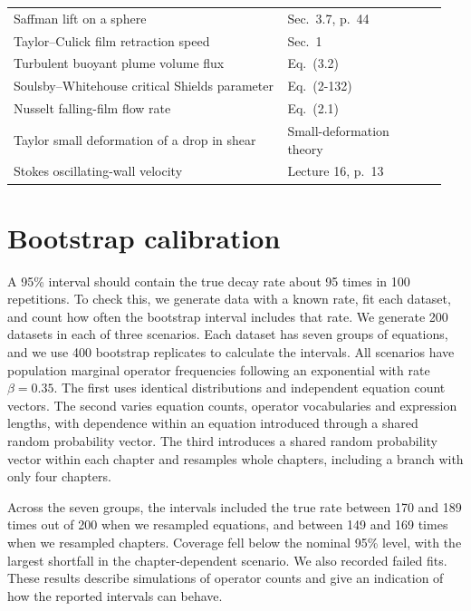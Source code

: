 \documentclass[10pt]{article}
\begin{document}
\begin{longtable}{@{}p{0.60\linewidth}p{0.35\linewidth}@{}}
Saffman lift on a sphere & Sec.~3.7, p.~44~\citep{feuillebois2004} \\
Taylor--Culick film retraction speed & Sec.~1~\citep{savva2009} \\
Turbulent buoyant plume volume flux & Eq.~(3.2)~\citep{limaneto2016} \\
Soulsby--Whitehouse critical Shields parameter & Eq.~(2-132)~\citep{hec2021} \\
Nusselt falling-film flow rate & Eq.~(2.1)~\citep{denner2018} \\
Taylor small deformation of a drop in shear & Small-deformation theory~\citep{megias2004} \\
Stokes oscillating-wall velocity & Lecture 16, p.~13~\citep{mit-marine2005} \\
\end{longtable}

\section{Bootstrap calibration}\label{app:calibration}
A 95\% interval should contain the true decay rate about 95 times in 100 repetitions. To check this, we generate data with a known rate, fit each dataset, and count how often the bootstrap interval includes that rate. We generate 200 datasets in each of three scenarios. Each dataset has seven groups of equations, and we use 400 bootstrap replicates to calculate the intervals. All scenarios have population marginal operator frequencies following an exponential with rate $\beta=0.35$. The first uses identical distributions and independent equation count vectors. The second varies equation counts, operator vocabularies and expression lengths, with dependence within an equation introduced through a shared random probability vector. The third introduces a shared random probability vector within each chapter and resamples whole chapters, including a branch with only four chapters.

Across the seven groups, the intervals included the true rate between 170 and 189 times out of 200 when we resampled equations, and between 149 and 169 times when we resampled chapters. Coverage fell below the nominal 95\% level, with the largest shortfall in the chapter-dependent scenario. We also recorded failed fits. These results describe simulations of operator counts and give an indication of how the reported intervals can behave.
\end{document}
